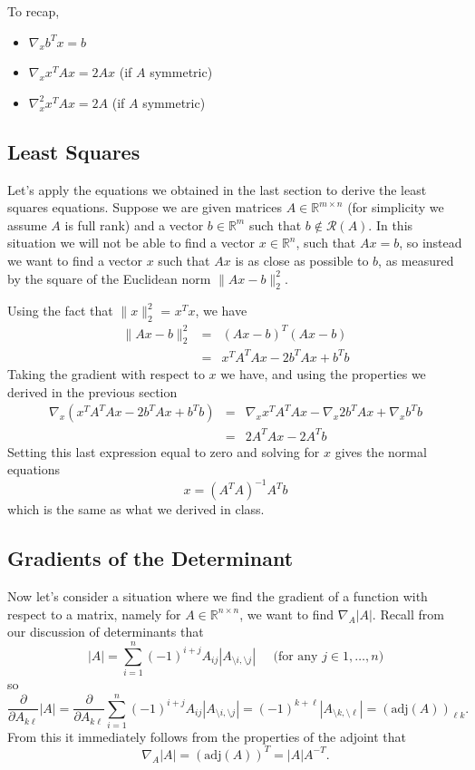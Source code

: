 \documentclass[12pt]{article}
\begin{document}
To recap,
\begin{itemize}
\item $\nabla_x b^T x = b$
\item $\nabla_x x^T A x = 2Ax$ (if $A$ symmetric)
\item $\nabla_x^2 x^T A x = 2A$ (if $A$ symmetric)
\end{itemize}

\subsection{Least Squares}

Let's apply the equations we obtained in the last section to
derive the least squares equations.  Suppose we are given matrices $A
\in \mathbb{R}^{m \times n}$ (for simplicity we assume $A$ is full
rank) and a vector $b \in \mathbb{R}^m$ such that $b \not \in
\mathcal{R}(A)$.  In this situation we will not be able to find a
vector $x \in \mathbb{R}^n$, such that $Ax = b$, so instead we want to
find a vector $x$ such that $Ax$ is as close as possible to $b$, as
measured by the square of the Euclidean norm $\|Ax - b\|_2^2$.

Using the fact that $\|x\|_2^2$ = $x^T x$, we have
\begin{eqnarray*}
\|Ax - b\|_2^2 & = & (Ax - b)^T(Ax - b) \\
& = & x^T A^T A x - 2b^T Ax + b^T b
\end{eqnarray*}
Taking the gradient with respect to $x$ we have, and using the
properties we derived in the previous section
\begin{eqnarray*}
\nabla_x (x^T A^T A x - 2b^T Ax + b^T b) & = & \nabla_x x^T A^T A x -
\nabla_x 2b^T Ax + \nabla_x b^T b \\
& = & 2 A^T A x - 2 A^T b
\end{eqnarray*}
Setting this last expression equal to zero and solving for $x$ gives
the normal equations 
\[x = (A^T A)^{-1}A^T b\]
which is the same as what we derived in class.

\subsection{Gradients of the Determinant}
Now let's consider a situation where we find the gradient of a function
with respect to a matrix, namely for $A \in \mathbb{R}^{n \times n}$,
we want to find $\nabla_A |A|$.  Recall from our discussion of
determinants that
\[ |A| = \sum_{i=1}^n (-1)^{i+j} A_{ij} |A_{\setminus i, \setminus
  j}| \;\;\;\;\;\mbox{(for any $j \in 1,\ldots, n$)} \]
so
\[\frac{\partial}{\partial A_{k \ell}}|A| =  \frac{\partial}{\partial
  A_{k \ell}}\sum_{i=1}^n (-1)^{i+j} A_{ij} 
|A_{\setminus i, \setminus j}| = (-1)^{k+\ell} |A_{\setminus k, \setminus
 \ell}| = (\mathrm{adj}(A))_{\ell k}.\]
From this it immediately follows from the properties of the adjoint
 that 
\[\nabla_A |A| = (\mathrm{adj}(A))^T = |A| A^{-T}.\]
\end{document}
